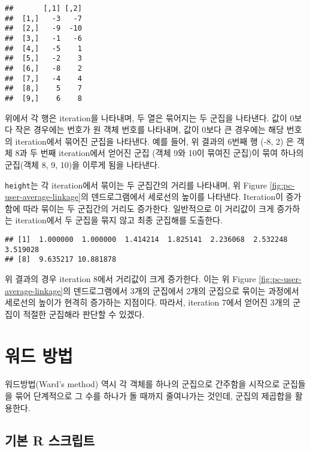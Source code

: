 \documentclass[]{book}
\newenvironment{Shaded}{\begin{snugshade}}{\end{snugshade}}
\newcommand{\NormalTok}[1]{#1}
\newcommand{\OperatorTok}[1]{\textcolor[rgb]{0.81,0.36,0.00}{\textbf{#1}}}
\begin{document}
\begin{verbatim}
##       [,1] [,2]
##  [1,]   -3   -7
##  [2,]   -9  -10
##  [3,]   -1   -6
##  [4,]   -5    1
##  [5,]   -2    3
##  [6,]   -8    2
##  [7,]   -4    4
##  [8,]    5    7
##  [9,]    6    8
\end{verbatim}

위에서 각 행은 iteration을 나타내며, 두 열은 묶어지는 두 군집을 나타낸다. 값이 0보다 작은 경우에는 번호가 원 객체 번호를 나타내며, 값이 0보다 큰 경우에는 해당 번호의 iteration에서 묶어진 군집을 나타낸다. 예를 들어, 위 결과의 6번째 행 (-8, 2) 은 객체 8과 두 번째 iteration에서 얻어진 군집 (객체 9와 10이 묶여진 군집)이 묶여 하나의 군집(객체 8, 9, 10)을 이루게 됨을 나타낸다.

\texttt{height}는 각 iteration에서 묶이는 두 군집간의 거리를 나타내며, 위 Figure \ref{fig:pc-user-average-linkage}의 덴드로그램에서 세로선의 높이를 나타낸다. Iteration이 증가함에 따라 묶이는 두 군집간의 거리도 증가한다. 일반적으로 이 거리값이 크게 증가하는 iteration에서 두 군집을 묶지 않고 최종 군집해를 도출한다.

\begin{Shaded}
\end{Shaded}

\begin{verbatim}
## [1]  1.000000  1.000000  1.414214  1.825141  2.236068  2.532248  3.519028
## [8]  9.635217 10.881878
\end{verbatim}

위 결과의 경우 iteration 8에서 거리값이 크게 증가한다. 이는 위 Figure \ref{fig:pc-user-average-linkage}의 덴드로그램에서 3개의 군집에서 2개의 군집으로 묶이는 과정에서 세로선의 높이가 현격히 증가하는 지점이다. 따라서, iteration 7에서 얻어진 3개의 군집이 적절한 군집해라 판단할 수 있겠다.

\hypertarget{ward-method}{%
\section{워드 방법}\label{ward-method}}

워드방법(Ward's method) 역시 각 객체를 하나의 군집으로 간주함을 시작으로 군집들을 묶어 단계적으로 그 수를 하나가 돌 때까지 줄여나가는 것인데, 군집의 제곱합을 활용한다.

\hypertarget{ward-method-basic-script}{%
\subsection{기본 R 스크립트}\label{ward-method-basic-script}}
\end{document}
